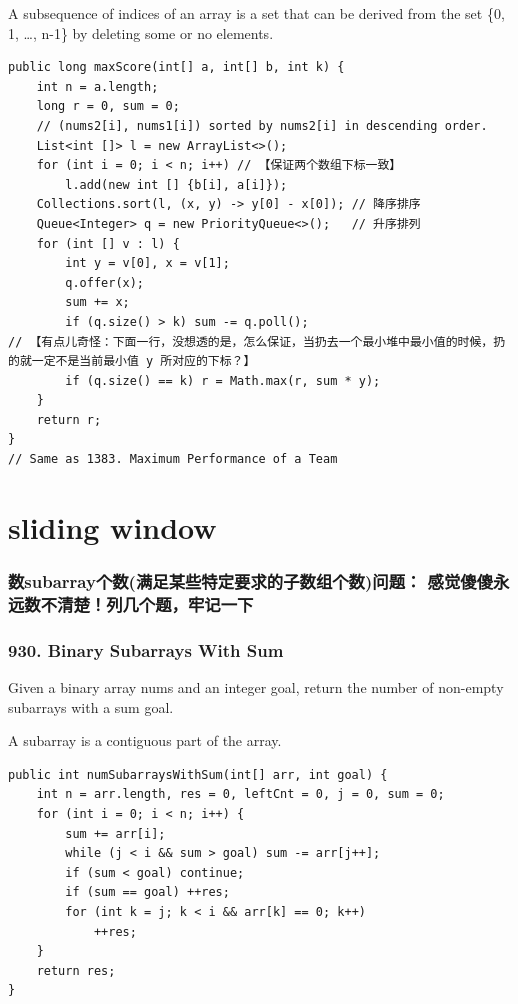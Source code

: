 \documentclass[9pt, b5paaper]{book}
\begin{document}
A subsequence of indices of an array is a set that can be derived from the set \{0, 1, \ldots{}, n-1\} by deleting some or no elements. 
\begin{verbatim}
public long maxScore(int[] a, int[] b, int k) {
    int n = a.length;
    long r = 0, sum = 0;
    // (nums2[i], nums1[i]) sorted by nums2[i] in descending order.
    List<int []> l = new ArrayList<>();
    for (int i = 0; i < n; i++) // 【保证两个数组下标一致】
        l.add(new int [] {b[i], a[i]});
    Collections.sort(l, (x, y) -> y[0] - x[0]); // 降序排序
    Queue<Integer> q = new PriorityQueue<>();   // 升序排列
    for (int [] v : l) {
        int y = v[0], x = v[1];
        q.offer(x);
        sum += x;
        if (q.size() > k) sum -= q.poll();
// 【有点儿奇怪：下面一行，没想透的是，怎么保证，当扔去一个最小堆中最小值的时候，扔的就一定不是当前最小值 y 所对应的下标？】
        if (q.size() == k) r = Math.max(r, sum * y);
    }            
    return r;
}
// Same as 1383. Maximum Performance of a Team
\end{verbatim}

\chapter{sliding window}
\label{sec-5}
\subsection{数subarray个数(满足某些特定要求的子数组个数)问题： 感觉傻傻永远数不清楚！列几个题，牢记一下}
\label{sec-5-0-1}
\subsection{930. Binary Subarrays With Sum}
\label{sec-5-0-2}
Given a binary array nums and an integer goal, return the number of non-empty subarrays with a sum goal.

A subarray is a contiguous part of the array.
\begin{verbatim}
public int numSubarraysWithSum(int[] arr, int goal) { 
    int n = arr.length, res = 0, leftCnt = 0, j = 0, sum = 0;
    for (int i = 0; i < n; i++) {
        sum += arr[i];
        while (j < i && sum > goal) sum -= arr[j++];
        if (sum < goal) continue;
        if (sum == goal) ++res;
        for (int k = j; k < i && arr[k] == 0; k++) 
            ++res;
    }
    return res;
}
\end{verbatim}
\end{document}
